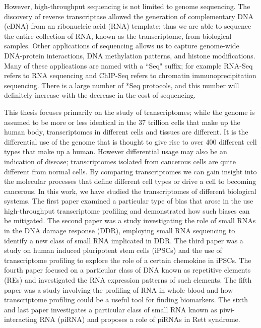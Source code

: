 However, high-throughput sequencing is not limited to genome sequencing. The discovery of reverse transcriptase\cite{pmid4316300, pmid4316301} allowed the generation of complementary DNA (cDNA) from an ribonucleic acid (RNA) template; thus we are able to sequence the entire collection of RNA, known as the transcriptome, from biological samples. Other applications of sequencing allows us to capture genome-wide DNA-protein interactions, DNA methylation patterns, and histone modifications\cite{applicationsofsequencing}. Many of these applications are named with a ``Seq" suffix; for example RNA-Seq refers to RNA sequencing and ChIP-Seq refers to chromatin immunoprecipitation sequencing. There is a large number of *Seq protocols\cite{pachter2014seq}, and this number will definitely increase with the decrease in the cost of sequencing.

This thesis focuses primarily on the study of transcriptomes; while the genome is assumed to be more or less identical in the 37 trillion cells that make up the human body\cite{pmid23829164}, transcriptomes in different cells and tissues are different. It is the differential use of the genome that is thought to give rise to over 400 different cell types that make up a human\cite{pmid16790079}. However differential usage may also be an indication of disease; transcriptomes isolated from cancerous cells are quite different from normal cells. By comparing transcriptomes we can gain insight into the molecular processes that define different cell types or drive a cell to becoming cancerous. In this work, we have studied the transcriptomes of different biological systems. The first paper examined a particular type of bias that arose in the use high-throughput transcriptome profiling and demonstrated how such biases can be mitigated\cite{Tang01022013}. The second paper was a study investigating the role of small RNAs in the DNA damage response (DDR), employing small RNA sequencing to identify a new class of small RNA implicated in DDR\cite{francia2012site}. The third paper was a study on human induced pluripotent stem cells (iPSCs) and the use of transcriptome profiling to explore the role of a certain chemokine in iPSCs. The fourth paper focused on a particular class of DNA known as repetitive elements (REs) and investigated the RNA expression patterns of such elements. The fifth paper was a study involving the profiling of RNA in whole blood and how transcriptome profiling could be a useful tool for finding biomarkers. The sixth and last paper investigates a particular class of small RNA known as piwi-interacting RNA (piRNA) and proposes a role of piRNAs in Rett syndrome.

